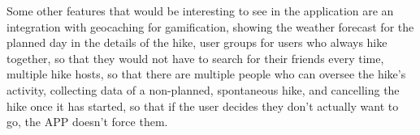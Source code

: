 Some other features that would be interesting to see in the application are an integration with geocaching\cite{geocaching} for gamification,
showing the weather forecast for the planned day in the details of the hike,
user groups for users who always hike together, so that they would not have to search for their friends every time,
multiple hike hosts, so that there are multiple people who can oversee the hike's activity,
collecting data of a non-planned, spontaneous hike,
and cancelling the hike once it has started, so that if the user decides they don't actually want to go, the APP doesn't force them.
